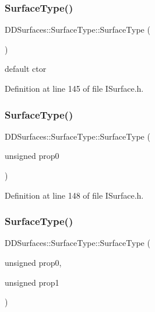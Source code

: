 \subsubsection{\texorpdfstring{Surface\+Type()}{SurfaceType()}\hspace{0.1cm}{\footnotesize\ttfamily [1/6]}}
{\footnotesize\ttfamily D\+D\+Surfaces\+::\+Surface\+Type\+::\+Surface\+Type (\begin{DoxyParamCaption}{ }\end{DoxyParamCaption})\hspace{0.3cm}{\ttfamily [inline]}}



default c\textquotesingle{}tor 



Definition at line 145 of file I\+Surface.\+h.

\hypertarget{class_d_d_surfaces_1_1_surface_type_a1eddfb236b06b6d2073b9cf5db598bc8}{}\label{class_d_d_surfaces_1_1_surface_type_a1eddfb236b06b6d2073b9cf5db598bc8} 
\subsubsection{\texorpdfstring{Surface\+Type()}{SurfaceType()}\hspace{0.1cm}{\footnotesize\ttfamily [2/6]}}
{\footnotesize\ttfamily D\+D\+Surfaces\+::\+Surface\+Type\+::\+Surface\+Type (\begin{DoxyParamCaption}\item[{unsigned}]{prop0 }\end{DoxyParamCaption})\hspace{0.3cm}{\ttfamily [inline]}}



Definition at line 148 of file I\+Surface.\+h.

\hypertarget{class_d_d_surfaces_1_1_surface_type_a080fbe4b3790adf465b77f5187440e31}{}\label{class_d_d_surfaces_1_1_surface_type_a080fbe4b3790adf465b77f5187440e31} 
\subsubsection{\texorpdfstring{Surface\+Type()}{SurfaceType()}\hspace{0.1cm}{\footnotesize\ttfamily [3/6]}}
{\footnotesize\ttfamily D\+D\+Surfaces\+::\+Surface\+Type\+::\+Surface\+Type (\begin{DoxyParamCaption}\item[{unsigned}]{prop0,  }\item[{unsigned}]{prop1 }\end{DoxyParamCaption})\hspace{0.3cm}{\ttfamily [inline]}}




